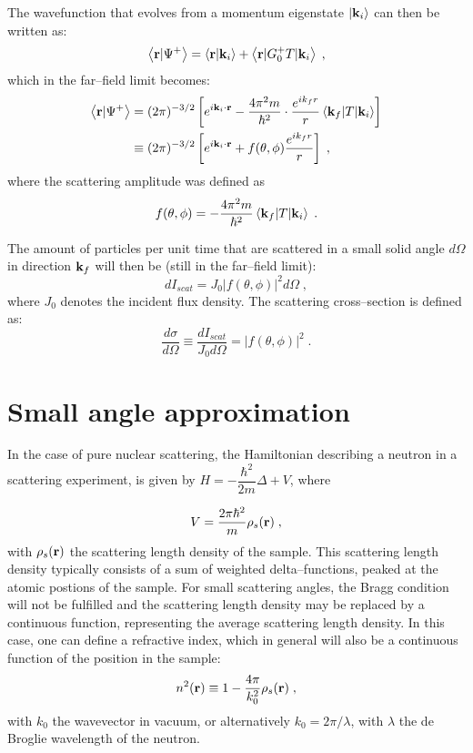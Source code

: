 The wavefunction that evolves from a momentum eigenstate $\vert \mathbf{k}_i \rangle$ can then be written as:
\begin{equation*}
  \left\langle \mathbf{r} \vert \Psi^+ \right\rangle = \left\langle \mathbf{r} \vert \mathbf{k}_i \right\rangle + \left\langle \mathbf{r} \vert G_0^+T \vert \mathbf{k}_i \right\rangle \; ,
\end{equation*}
which in the far--field limit becomes:
\begin{align*}
  \left\langle \mathbf{r} \vert \Psi^+ \right\rangle &= (2\pi)^{-3/2}\left[ e^{i\mathbf{k}_i\cdot\mathbf{r}} - \frac{4\pi^2m}{\hbar^2}\cdot\frac{e^{ik_f r}}{r} \left\langle \mathbf{k}_f \vert T \vert \mathbf{k}_i \right\rangle \right]  \\
  &\equiv (2\pi)^{-3/2}\left[ e^{i\mathbf{k}_i\cdot\mathbf{r}} + f(\theta,\phi)\frac{e^{ik_f r}}{r} \right] \; ,
\end{align*}
where the scattering amplitude was defined as
\begin{equation*}
  f(\theta, \phi) = -\frac{4\pi^2m}{\hbar^2}\left\langle \mathbf{k}_f \vert T \vert \mathbf{k}_i \right\rangle \; .
\end{equation*}

The amount of particles per unit time that are scattered in a small solid angle $d\Omega$ in direction $\mathbf{k}_f$ will then be (still in the far--field limit):
\begin{equation*}
  dI_{scat} = J_0\lvert f(\theta,\phi)\rvert^2d\Omega \; ,
\end{equation*}
where $J_0$ denotes the incident flux density. The scattering cross--section is defined as:
\begin{equation*}
  \frac{d\sigma}{d\Omega}\equiv \frac{dI_{scat}}{J_0 d\Omega} = \lvert f(\theta,\phi) \rvert^2 \; .
\end{equation*}
\section{Small angle approximation}
In the case of pure nuclear scattering, the Hamiltonian describing a neutron in a scattering experiment, is given by $H = -\dfrac{\hbar^2}{2m}\Delta + V$, where

\begin{equation*}
  V = \frac{2\pi \hbar^2}{m}\rho_s(\mathbf{r}) \; ,
\end{equation*}
with $\rho_s(\mathbf{r})$ the scattering length density of the sample. This scattering length density typically consists of a sum of weighted delta--functions, peaked at the atomic postions of the sample. For small scattering angles, the Bragg condition will not be fulfilled and the scattering length density may be replaced by a continuous function, representing the average scattering length density. In this case, one can define a refractive index, which in general will also be a continuous function of the position in the sample:
\begin{equation*}
  n^2(\mathbf{r}) \equiv 1 - \frac{4\pi}{k_0^2}\rho_s(\mathbf{r}) \; ,
\end{equation*}
with $k_0$ the wavevector in vacuum, or alternatively $k_0 = 2\pi /\lambda$, with $\lambda$ the de Broglie wavelength of the neutron.



